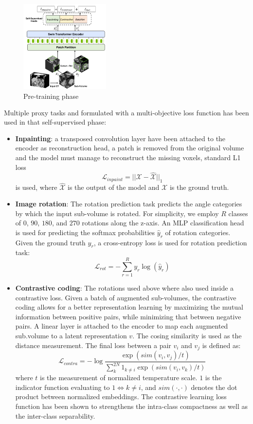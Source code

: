 \begin{figure}[ht!]
  \centering
  \includegraphics[width=0.4\textwidth]{Images/pretrain-unetr.png}
  \caption{Pre-training phase}
  \label{fig:pretrain-unetr}
\end{figure}
Multiple proxy tasks and formulated with a multi-objective loss function has
been used in that self-supervised phase:
\begin{itemize}
  \item{\textbf{Inpainting}: a transposed convolution layer have been attached
    to the encoder as reconstruction head, a patch is removed from the original
    volume and the model must manage to reconstruct the missing voxels, standard
    L1 loss $$\mathcal{L}_{inpaint} = ||\mathcal{X} - \hat{\mathcal{X}}||_1$$ is
    used, where $\hat{\mathcal{X}}$ is the output of the model and $\mathcal{X}$
    is the ground truth.}
  \item{\textbf{Image rotation}: The rotation prediction task predicts the angle
    categories by which the input sub-volume is rotated. For simplicity, we
    employ $R$ classes of $0$, $90$, $180$, and $270$ rotations along the
    z-axis. An MLP classification head is used for predicting the softmax
    probabilities $\hat{y}_r$ of rotation categories. Given the ground truth
    $y_r$, a cross-entropy loss is used for rotation prediction task:
    $$\mathcal{L}_{rot} = -\sum^R_{r=1}y_r\log(\hat{y}_r)$$}
  \item{\textbf{Contrastive coding}: The rotations used above where also used
    inside a contrastive loss. Given a batch of augmented sub-volumes, the
    contrastive coding allows for a better representation learning by maximizing
    the mutual information between positive pairs, while minimizing that between
    negative pairs. A linear layer is attached to the encoder to map each
    augmented sub.volume to a latent representation $v$. The cosing similarity
    is used as the distance measurement. The final loss between a pair $v_i$ and
    $v_j$ is defined as:
    $$\mathcal{L}_{contra} = -\log{\frac{\exp{(sim(v_i,v_j)/t)}}{\sum_k^{2N}1_{k
    \neq i}\exp{(sim(v_i,v_k)/t)}}}$$
    where $t$ is the measurement of normalized temperature scale. $1$ is the
    indicator function evaluating to $1 \iff k \neq i$, and $sim(\cdot, \cdot)$
    denotes the dot product between normalized embeddings.
    The contrastive learning loss function has been shown to strengthens the
    intra-class compactness as well as the inter-class separability.}
\end{itemize}

